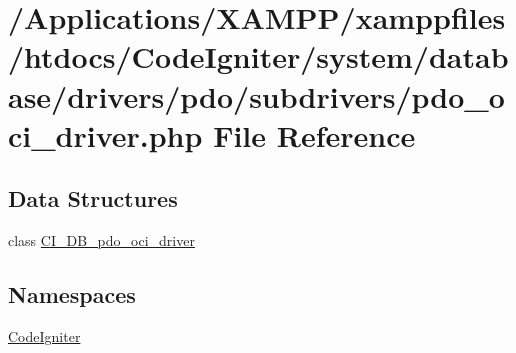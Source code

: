 \hypertarget{pdo__oci__driver_8php}{}\section{/\+Applications/\+X\+A\+M\+P\+P/xamppfiles/htdocs/\+Code\+Igniter/system/database/drivers/pdo/subdrivers/pdo\+\_\+oci\+\_\+driver.php File Reference}
\label{pdo__oci__driver_8php}
\subsection*{Data Structures}
\begin{DoxyCompactItemize}
\item 
class \mbox{\hyperlink{class_c_i___d_b__pdo__oci__driver}{C\+I\+\_\+\+D\+B\+\_\+pdo\+\_\+oci\+\_\+driver}}
\end{DoxyCompactItemize}
\subsection*{Namespaces}
\begin{DoxyCompactItemize}
\item 
 \mbox{\hyperlink{namespace_code_igniter}{Code\+Igniter}}
\end{DoxyCompactItemize}
